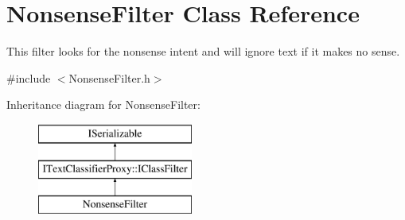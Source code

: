 \hypertarget{class_nonsense_filter}{}\section{Nonsense\+Filter Class Reference}
\label{class_nonsense_filter}


This filter looks for the nonsense intent and will ignore text if it makes no sense.  




{\ttfamily \#include $<$Nonsense\+Filter.\+h$>$}

Inheritance diagram for Nonsense\+Filter\+:\begin{figure}[H]
\begin{center}
\leavevmode
\includegraphics[height=3.000000cm]{class_nonsense_filter}
\end{center}
\end{figure}
